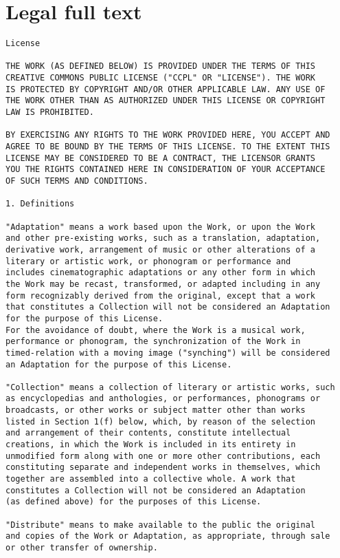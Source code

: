 \section{Legal full text}

\begin{verbatim}
License

THE WORK (AS DEFINED BELOW) IS PROVIDED UNDER THE TERMS OF THIS 
CREATIVE COMMONS PUBLIC LICENSE ("CCPL" OR "LICENSE"). THE WORK
IS PROTECTED BY COPYRIGHT AND/OR OTHER APPLICABLE LAW. ANY USE OF
THE WORK OTHER THAN AS AUTHORIZED UNDER THIS LICENSE OR COPYRIGHT
LAW IS PROHIBITED.

BY EXERCISING ANY RIGHTS TO THE WORK PROVIDED HERE, YOU ACCEPT AND
AGREE TO BE BOUND BY THE TERMS OF THIS LICENSE. TO THE EXTENT THIS
LICENSE MAY BE CONSIDERED TO BE A CONTRACT, THE LICENSOR GRANTS
YOU THE RIGHTS CONTAINED HERE IN CONSIDERATION OF YOUR ACCEPTANCE
OF SUCH TERMS AND CONDITIONS.

1. Definitions

"Adaptation" means a work based upon the Work, or upon the Work
and other pre-existing works, such as a translation, adaptation,
derivative work, arrangement of music or other alterations of a
literary or artistic work, or phonogram or performance and
includes cinematographic adaptations or any other form in which
the Work may be recast, transformed, or adapted including in any
form recognizably derived from the original, except that a work
that constitutes a Collection will not be considered an Adaptation
for the purpose of this License.
For the avoidance of doubt, where the Work is a musical work,
performance or phonogram, the synchronization of the Work in
timed-relation with a moving image ("synching") will be considered
an Adaptation for the purpose of this License.

"Collection" means a collection of literary or artistic works, such
as encyclopedias and anthologies, or performances, phonograms or
broadcasts, or other works or subject matter other than works
listed in Section 1(f) below, which, by reason of the selection
and arrangement of their contents, constitute intellectual
creations, in which the Work is included in its entirety in
unmodified form along with one or more other contributions, each
constituting separate and independent works in themselves, which
together are assembled into a collective whole. A work that
constitutes a Collection will not be considered an Adaptation
(as defined above) for the purposes of this License.

"Distribute" means to make available to the public the original
and copies of the Work or Adaptation, as appropriate, through sale
or other transfer of ownership.


\end{verbatim}
